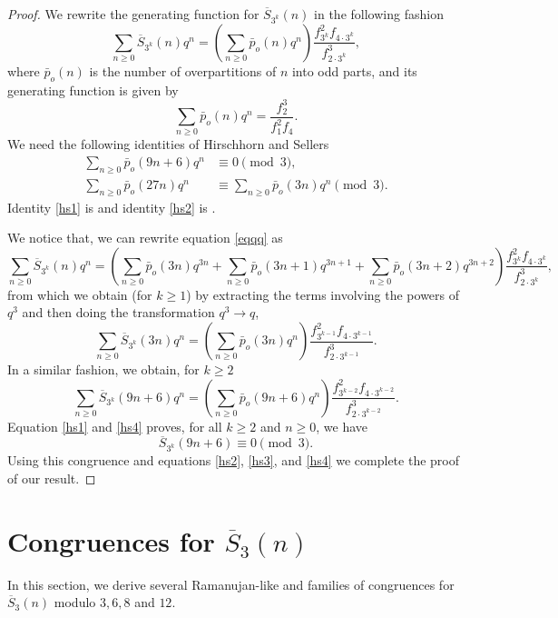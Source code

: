 \documentclass[12pt]{amsart}
\newcommand{\sst}{\overline{S}}
\theoremstyle{plain}
\theoremstyle{definition}
\begin{document}
\begin{proof}
We rewrite the generating function for $\sst_{3^k}(n)$ in the following fashion
\begin{equation}\label{eqqq}
\sum_{n\geq 0}\sst_{3^k}(n)q^n=\left(\sum_{n\geq 0}\bar p_o(n)q^n\right)\frac{f_{3^k}^2f_{4\cdot 3^k}}{f^3_{2\cdot 3^k}},
\end{equation}
where $\bar p_o(n)$ is the number of overpartitions of $n$ into odd parts, and its generating function is given by
\[
\sum_{n\geq 0}\bar p_o(n)q^n=\frac{f_2^3}{f_1^2f_4}.
\]
We need the following identities of Hirschhorn and Sellers \cite{HS06}
\begin{align}
\sum_{n\geq 0}\bar p_o(9n+6)q^n &\equiv 0 \pmod 3,\label{hs1}\\
\sum_{n\geq 0}\bar p_o(27n)q^n &\equiv \sum_{n\geq 0}\bar p_o(3n)q^n \pmod 3\label{hs2}.
\end{align}
Identity \eqref{hs1} is \cite[Theorem 3.5]{HS06} and identity \eqref{hs2} is \cite[Theorem 3.8]{HS06}.

We notice that, we can rewrite equation \eqref{eqqq} as
\[
\sum_{n\geq 0}\sst_{3^k}(n)q^n=\left(\sum_{n\geq 0}\bar p_o(3n)q^{3n}+\sum_{n\geq 0}\bar p_o(3n+1)q^{3n+1}+\sum_{n\geq 0}\bar p_o(3n+2)q^{3n+2}\right)\frac{f_{3^k}^2f_{4\cdot 3^k}}{f^3_{2\cdot 3^k}},
\]
from which we obtain (for $k\geq 1$) by extracting the terms involving the powers of $q^3$ and then doing the transformation $q^3\rightarrow q$,
\begin{equation}\label{hs3}
\sum_{n\geq 0}\sst_{3^k}(3n)q^n=\left(\sum_{n\geq 0}\bar p_o(3n)q^{n}\right)\frac{f_{3^{k-1}}^2f_{4\cdot 3^{k-1}}}{f^3_{2\cdot 3^{k-1}}}.
\end{equation}
In a similar fashion, we obtain, for $k\geq 2$
\begin{equation}\label{hs4}
\sum_{n\geq 0}\sst_{3^k}(9n+6)q^n=\left(\sum_{n\geq 0}\bar p_o(9n+6)q^{n}\right)\frac{f_{3^{k-2}}^2f_{4\cdot 3^{k-2}}}{f^3_{2\cdot 3^{k-2}}}.
\end{equation}
Equation \eqref{hs1} and \eqref{hs4} proves, for all $k\geq 2$ and $n\geq 0$, we have
\[
\sst_{3^k}(9n+6)\equiv 0 \pmod 3.
\]
Using this congruence and equations \eqref{hs2}, \eqref{hs3}, and \eqref{hs4} we complete the proof of our result.
\end{proof}






\section{Congruences for $\overline{S}_{3}(n)$} \label{sec2}
In this section, we derive several Ramanujan-like and families of congruences for $\overline{S}_{3}(n)$ modulo $3,6,8$ and $12$.
\end{document}
